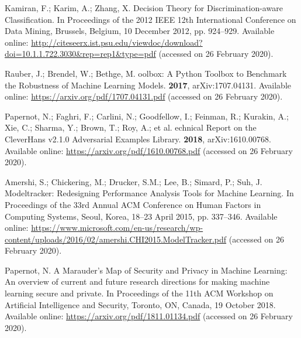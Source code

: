 \documentclass[information,article,accept,moreauthors,pdftex]{Definitions/mdpi}
\begin{document}
\begin{thebibliography}{999}
Kamiran, F.; Karim, A.; Zhang, X.
\newblock Decision {T}heory for {D}iscrimination-aware {C}lassification.
\newblock  In Proceedings of the 2012 IEEE 12th International Conference on Data Mining, Brussels, Belgium, 10 December 2012, pp. 924--929.
\newblock Available online: 
  \url{http://citeseerx.ist.psu.edu/viewdoc/download?doi=10.1.1.722.3030&rep=rep1&type=pdf} (accessed on 26 February 2020).

Rauber, J.; Brendel, W.; Bethge, M.
oolbox: {A} {P}ython {T}oolbox to {B}enchmark the {R}obustness of
  {M}achine {L}earning {M}odels.
 {\bf 2017}, arXiv:1707.04131.
\newblock Available online: \url{https://arxiv.org/pdf/1707.04131.pdf} (accessed on 26 February 2020).

Papernot, N.; Faghri, F.; Carlini, N.; Goodfellow, I.; Feinman, R.; Kurakin,
  A.; Xie, C.; Sharma, Y.; Brown, T.; Roy, A.; et al.
echnical {R}eport on the {C}leverHans v2.1.0 {A}dversarial
  {E}xamples {L}ibrary.
 {\bf 2018}, arXiv:1610.00768.
\newblock Available online: \url{https://arxiv.org/pdf/1610.00768.pdf} (accessed on 26 February 2020).

Amershi, S.; Chickering, M.; Drucker, S.M.; Lee, B.; Simard, P.; Suh, J.
\newblock Modeltracker: {R}edesigning {P}erformance {A}nalysis {T}ools for
  {M}achine {L}earning.
\newblock  In Proceedings of the 33rd Annual ACM Conference on Human Factors in
  Computing Systems, Seoul, Korea, 18--23 April 2015, pp. 337--346. %
\newblock Available online: 
  \url{https://www.microsoft.com/en-us/research/wp-content/uploads/2016/02/amershi.CHI2015.ModelTracker.pdf} (accessed on 26 February 2020).

Papernot, N.
\newblock A {M}arauder's {M}ap of {S}ecurity and {P}rivacy in {M}achine
  {L}earning: {A}n overview of current and future research directions for
  making machine learning secure and private.
\newblock  In Proceedings of the 11th ACM Workshop on Artificial Intelligence and
  Security, Toronto, ON, Canada, 19 October 2018. %
\newblock Available online: \url{https://arxiv.org/pdf/1811.01134.pdf} (accessed on 26 February 2020).


\end{thebibliography}
\end{document}
